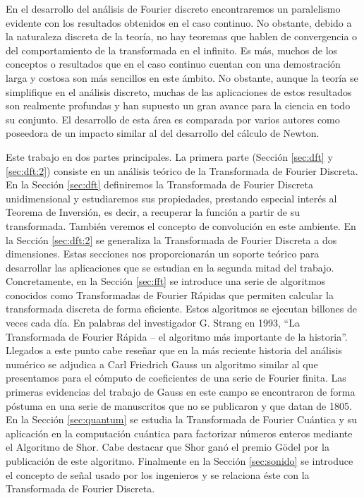 \documentclass{article}
\begin{document}

En el desarrollo del análisis de Fourier discreto encontraremos un paralelismo evidente con los resultados obtenidos en el caso continuo. No obstante, debido a la naturaleza discreta de la teoría, no hay teoremas que hablen de convergencia o del comportamiento de la transformada en el infinito. Es más, muchos de los conceptos o resultados que en el caso continuo cuentan con una demostración larga y costosa son más sencillos en este ámbito. No obstante, aunque la teoría se simplifique en el análisis discreto, muchas de las aplicaciones de estos resultados son realmente profundas y han supuesto un gran avance para la ciencia en todo su conjunto. El desarrollo de esta área es comparada por varios autores como poseedora de un impacto similar al del desarrollo del cálculo de Newton.

Este trabajo en dos partes principales. La primera parte (Sección \ref{sec:dft} y \ref{sec:dft:2}) consiste en un análisis teórico de la Transformada de Fourier Discreta. En la Sección \ref{sec:dft} definiremos la Transformada de Fourier Discreta unidimensional y estudiaremos sus propiedades, prestando especial interés al Teorema de Inversión, es decir, a recuperar la función a partir de su transformada. También veremos el concepto de convolución en este ambiente. En la Sección \ref{sec:dft:2} se generaliza la Transformada de Fourier Discreta a dos dimensiones. Estas secciones nos proporcionarán un soporte teórico para desarrollar las aplicaciones que se estudian en la segunda mitad del trabajo.  Concretamente, en la Sección \ref{sec:fft} se introduce una serie de algoritmos conocidos como Transformadas de Fourier Rápidas que permiten calcular la transformada discreta de forma eficiente. Estos algoritmos se ejecutan billones de veces cada día. En palabras del investigador G. Strang en 1993, ``La Transformada de Fourier Rápida -- el algoritmo más importante de la historia''. Llegados a este punto cabe reseñar que en la más reciente historia del análisis numérico se adjudica a Carl Friedrich Gauss un algoritmo similar al que presentamos para el cómputo de coeficientes de una serie de Fourier finita. Las primeras evidencias del trabajo de Gauss en este campo se encontraron de forma póstuma en una serie de manuscritos que no se publicaron y que datan de 1805. En la Sección \ref{sec:quantum} se estudia la Transformada de Fourier Cuántica y su aplicación en la computación cuántica para factorizar números enteros mediante el Algoritmo de Shor. Cabe destacar que Shor ganó el premio G\"odel por la publicación de este algoritmo. Finalmente en la Sección \ref{sec:sonido} se introduce el concepto de señal usado por los ingenieros y se relaciona éste con la Transformada de Fourier Discreta.
\end{document}
